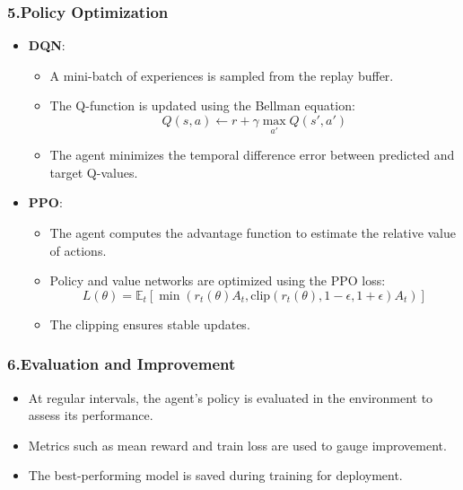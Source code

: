 \subsubsection{5.Policy Optimization}
\begin{itemize}
    \item \textbf{DQN}:
    \begin{itemize}
        \item A mini-batch of experiences is sampled from the replay buffer.
        \item The Q-function is updated using the Bellman equation:
        \begin{equation}
        Q(s, a) \leftarrow r + \gamma \max_{a'} Q(s', a')
        \end{equation}
        \item The agent minimizes the temporal difference error between predicted and target Q-values.
    \end{itemize}
    \item \textbf{PPO}:
    \begin{itemize}
        \item The agent computes the advantage function to estimate the relative value of actions.
        \item Policy and value networks are optimized using the PPO loss:
        \begin{equation}
        L(\theta) = \mathbb{E}_t\left[ \min \left( r_t(\theta) A_t, \text{clip}(r_t(\theta), 1-\epsilon, 1+\epsilon) A_t \right) \right]
        \end{equation}
        \item The clipping ensures stable updates.
    \end{itemize}
\end{itemize}

\subsubsection{6.Evaluation and Improvement}
\begin{itemize}
    \item At regular intervals, the agent's policy is evaluated in the environment to assess its performance.
    \item Metrics such as mean reward and train loss are used to gauge improvement.
    \item The best-performing model is saved during training for deployment.
\end{itemize}

